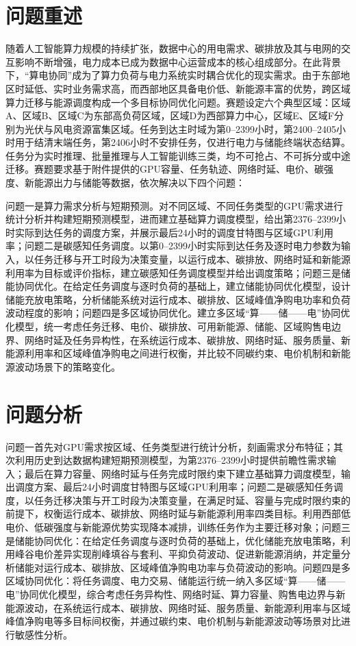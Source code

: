 \documentclass{ctexart}
\begin{document}
\section{问题重述}
随着人工智能算力规模的持续扩张，数据中心的用电需求、碳排放及其与电网的交互影响不断增强，电力成本已成为数据中心运营成本的核心组成部分。在此背景下，“算电协同”成为了算力负荷与电力系统实时耦合优化的现实需求。由于东部地区时延低、实时业务需求高，而西部地区具备电价低、新能源丰富的优势，跨区域算力迁移与能源调度构成一个多目标协同优化问题。赛题设定六个典型区域：区域A、区域B、区域C为东部高负荷区域，区域D为西部算力中心，区域E、区域F分别为光伏与风电资源富集区域。任务到达主时域为第0–2399小时，第2400–2405小时用于结清末端任务，第2406小时不安排任务，仅进行电力与储能终端状态结算。任务分为实时推理、批量推理与人工智能训练三类，均不可抢占、不可拆分或中途迁移。赛题要求基于附件提供的GPU容量、任务轨迹、网络时延、电价、碳强度、新能源出力与储能等数据，依次解决以下四个问题：

问题一是算力需求分析与短期预测。对不同区域、不同任务类型的GPU需求进行统计分析并构建短期预测模型，进而建立基础算力调度模型，给出第2376–2399小时实际到达任务的调度方案，并展示最后24小时的调度甘特图与区域GPU利用率；问题二是碳感知任务调度。以第0–2399小时实际到达任务及逐时电力参数为输入，以任务迁移与开工时段为决策变量，以运行成本、碳排放、网络时延和新能源利用率为目标或评价指标，建立碳感知任务调度模型并给出调度策略；问题三是储能协同优化。在给定任务调度与逐时负荷的基础上，建立储能协同优化模型，设计储能充放电策略，分析储能系统对运行成本、碳排放、区域峰值净购电功率和负荷波动程度的影响；问题四是多区域协同优化。建立多区域“算——储——电”协同优化模型，统一考虑任务迁移、电价、碳排放、可用新能源、储能、区域购售电边界、网络时延及任务异构性，在系统运行成本、碳排放、网络时延、服务质量、新能源利用率和区域峰值净购电之间进行权衡，并比较不同碳约束、电价机制和新能源波动场景下的策略变化。

\section{问题分析}

问题一首先对GPU需求按区域、任务类型进行统计分析，刻画需求分布特征；其次利用历史到达数据构建短期预测模型，为第2376–2399小时提供前瞻性需求输入；最后在算力容量、网络时延与任务完成时限约束下建立基础算力调度模型，输出调度方案、最后24小时调度甘特图与区域GPU利用率；问题二是碳感知任务调度，以任务迁移决策与开工时段为决策变量，在满足时延、容量与完成时限约束的前提下，权衡运行成本、碳排放、网络时延与新能源利用率四类目标。利用西部低电价、低碳强度与新能源优势实现降本减排，训练任务作为主要迁移对象；问题三是储能协同优化：在给定任务调度与逐时负荷的基础上，优化储能充放电策略，利用峰谷电价差异实现削峰填谷与套利、平抑负荷波动、促进新能源消纳，并定量分析储能对运行成本、碳排放、区域峰值净购电功率与负荷波动的影响。问题四是多区域协同优化：将任务调度、电力交易、储能运行统一纳入多区域“算——储——电”协同优化模型，综合考虑任务异构性、网络时延、算力容量、购售电边界与新能源波动，在系统运行成本、碳排放、网络时延、服务质量、新能源利用率与区域峰值净购电等多目标间权衡，并通过碳约束、电价机制与新能源波动等场景对比进行敏感性分析。
\end{document}
